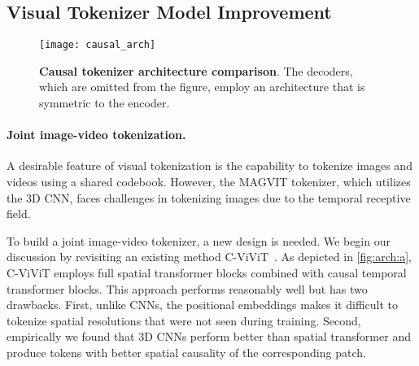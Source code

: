 
\subsection{Visual Tokenizer Model Improvement}\label{sec:tokenizer_improvement}
\begin{figure}[tp]
\vspace{-6mm}
    \centering
    \begin{subfigure}{1\textwidth} %
    \label{fig:arch:a}
    \label{fig:arch:b}
    \label{fig:arch:c}
    \end{subfigure}%
    \texttt{[image: causal\_arch]}
    \vspace{-2mm}
    \caption{\textbf{Causal tokenizer architecture comparison}.
    The decoders, which are omitted from the figure, employ an architecture that is symmetric to the encoder.
    }
    \label{fig:arch}
    \vspace{-6mm}
\end{figure}

\vspace{-2mm}
\paragraph{Joint image-video tokenization.}
A desirable feature of visual tokenization is the capability to tokenize images and videos using a shared codebook. However, the MAGVIT tokenizer, which utilizes the 3D CNN, faces challenges in tokenizing images due to the temporal receptive field. %

To build a joint image-video tokenizer, a new design is needed. We begin our discussion by revisiting an existing method C-ViViT~\citep{villegas2022phenaki}. As depicted in \cref{fig:arch:a}, C-ViViT employs full spatial transformer blocks combined with causal temporal transformer blocks. This approach performs reasonably well but has two drawbacks. First, unlike CNNs, the positional embeddings makes it difficult to tokenize spatial resolutions that were not seen during training. Second, empirically we found that 3D CNNs perform better than spatial transformer and produce tokens with better spatial causality of the corresponding patch.

